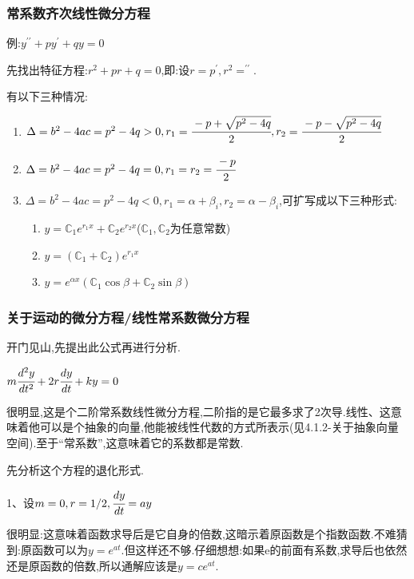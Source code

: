 \documentclass[UTF8,12pt]{ctexbook}
\newcommand{\derivative}{^\prime}
\newcommand{\doubleDerivative}{^{\prime\prime}}
\newcommand{\mathConstant}{\mathbb{C}}
\begin{document}
{{{{}%

\subsubsection{常系数齐次线性微分方程}{
  例:$y\doubleDerivative + py\derivative + qy = 0$

  先找出特征方程:$r^2 + pr + q = 0$,即:设$r = p\derivative,r^2 = \doubleDerivative$.

  有以下三种情况:
  \begin{enumerate}
    \item $\Delta = b^2 - 4ac = p^2 - 4q > 0,r_1 = \cfrac{-p + \sqrt{p^2 - 4q}}{2}, r_2 = \cfrac{-p - \sqrt{p^2 - 4q}}{2}$
    \item $\Delta = b^2 - 4ac = p^2 - 4q = 0,r_1 = r_2 = \cfrac{-p}{2}$
    \item {$\Delta = b^2 - 4ac = p^2 - 4q < 0,r_1 = \alpha + \beta_i, r_2 = \alpha - \beta_i$,可扩写成以下三种形式:

          \begin{enumerate}
            \item $y = \mathConstant_1e^{r_1x} + \mathConstant_2e^{r_2x}$($\mathConstant_1,\mathConstant_2$为任意常数)
            \item $y = (\mathConstant_1 + \mathConstant_2)e^{r_1x}$
            \item $y = e^{\alpha x}(\mathConstant_1\cos\beta + \mathConstant_2\sin\beta)$
          \end{enumerate}
          }
  \end{enumerate}

}%

\subsubsection{关于运动的微分方程/线性常系数微分方程}{
开门见山,先提出此公式再进行分析.

$m\cfrac{d^2y}{dt^2} + 2r\cfrac{dy}{dt} + ky = 0$

很明显,这是个二阶常系数线性微分方程,二阶指的是它最多求了2次导.线性、这意味着他可以是个抽象的向量,他能被线性代数的方式所表示(见4.1.2-关于抽象向量空间).至于“常系数”,这意味着它的系数都是常数.

先分析这个方程的退化形式.

1、设$m = 0, r = 1/2, \cfrac{dy}{dt} = ay$

很明显:这意味着函数求导后是它自身的倍数,这暗示着原函数是个指数函数.不难猜到:原函数可以为$y = e^{at}$.但这样还不够.仔细想想:如果e的前面有系数,求导后也依然还是原函数的倍数,所以通解应该是$y = ce^{at}$.

}}}}
\end{document}
